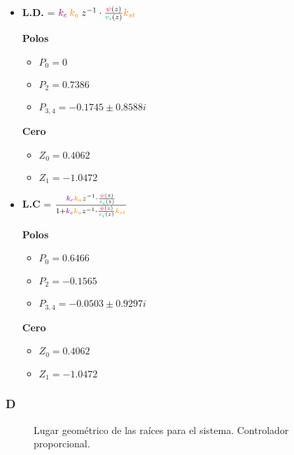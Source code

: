  \begin{itemize}
  \item \textbf{L.D.} = \( \mora{k_{c}} \nara{ k_{a}} z^{-1} \cdot \frac{\rojo{\psi}(z)}{\verd{v_i}(z)} \nara{k_{st}} \) 
  
  \begin{multicols}{2}
    \textbf{Polos}
    \begin{itemize}
      \item \(P_{0} = 0 \)
      \item \(P_{2} = 0.7386\)
      \item \(P_{3,4} = -0.1745 \pm 0.8588i\) 
    \end{itemize}
    \columnbreak
    \textbf{Cero}
    \begin{itemize}
        \item \(Z_0 = 0.4062\)
        \item \(Z_1 = -1.0472\)
    \end{itemize}
  \end{multicols}

  \item \textbf{L.C} =  \(\frac{  \mora{k_{c}} \nara{ k_{a}} z^{-1} \cdot \frac{\rojo{\psi}(z)}{\verd{v_i}(z)}} {1+ \mora{k_{c}} \nara{ k_{a}} z^{-1} \cdot \frac{\rojo{\psi}(z)}{\verd{v_i}(z)} \nara{k_{st}} }  \)
  
  \begin{multicols}{2}
    \textbf{Polos}
    \begin{itemize}
      \item \(P_{0} = 0.6466 \)
      \item \(P_{2} = -0.1565\)
      \item \(P_{3,4} = -0.0503 \pm 0.9297i\) 
    \end{itemize}
    \columnbreak
    \textbf{Cero}
    \begin{itemize}
        \item \(Z_0 = 0.4062\)
        \item \(Z_1 = -1.0472\)
    \end{itemize}
  \end{multicols}
 \end{itemize}



\FloatBarrier
\subsubsection{D}%

\begin{figure}[ht]
    \centering
    
    \caption{Lugar geométrico de las raíces para el sistema. Controlador proporcional.}
    \label{fig:lgr-i1}
\end{figure}

